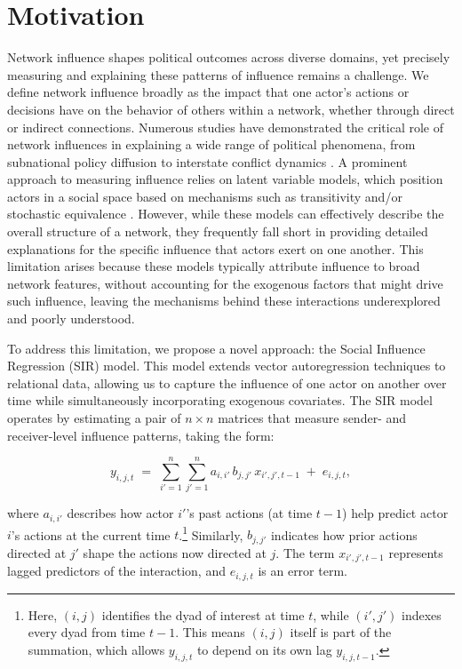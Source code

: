 \section*{\textbf{Motivation}}

Network influence shapes political outcomes across diverse domains, yet precisely measuring and explaining these patterns of influence remains a challenge. We define network influence broadly as the impact that one actor's actions or decisions have on the behavior of others within a network, whether through direct or indirect connections. Numerous studies have demonstrated the critical role of network influences in explaining a wide range of political phenomena, from subnational policy diffusion to interstate conflict dynamics \citep{cranmer:etal:2015a, beardsley:etal:2020, nieman:etal:2021, edgerton:2024}. A prominent approach to measuring influence relies on latent variable models, which position actors in a social space based on mechanisms such as transitivity and/or stochastic equivalence \citep{gade:etal:2019, huhe:etal:2021, edgerton:2024}. However, while these models can effectively describe the overall structure of a network, they frequently fall short in providing detailed explanations for the specific influence that actors exert on one another. This limitation arises because these models typically attribute influence to broad network features, without accounting for the exogenous factors that might drive such influence, leaving the mechanisms behind these interactions underexplored and poorly understood.

To address this limitation, we propose a novel approach: the Social Influence Regression (SIR) model. This model extends vector autoregression techniques to relational data, allowing us to capture the influence of one actor on another over time while simultaneously incorporating exogenous covariates. The SIR model operates by estimating a pair of $n \times n$ matrices that measure sender- and receiver-level influence patterns, taking the form:

\[
y_{i,j,t} 
\;=\; \sum_{i'=1}^{n} \sum_{j'=1}^{n} a_{i,i'} \, b_{j,j'} \, x_{i',j',t-1}
\;+\; e_{i,j,t},
\]

where $a_{i,i'}$ describes how actor $i'$'s past actions (at time $t-1$) help predict actor $i$'s actions at the current time $t$.\footnote{Here, $(i,j)$ identifies the dyad of interest at time $t$, while $(i',j')$ indexes every dyad from time $t-1$. This means $(i,j)$ itself is part of the summation, which allows $y_{i,j,t}$ to depend on its own lag $y_{i,j,t-1}$.} Similarly, $b_{j,j'}$ indicates how prior actions directed at $j'$ shape the actions now directed at $j$. The term $x_{i',j',t-1}$ represents lagged predictors of the interaction, and $e_{i,j,t}$ is an error term.

